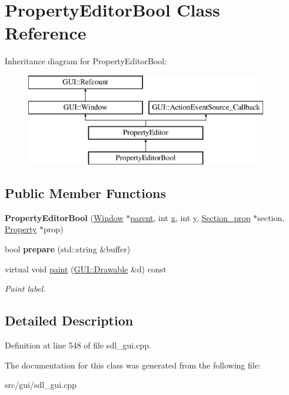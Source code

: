 \hypertarget{classPropertyEditorBool}{\section{Property\-Editor\-Bool Class Reference}
\label{classPropertyEditorBool}
}
Inheritance diagram for Property\-Editor\-Bool\-:\begin{figure}[H]
\begin{center}
\leavevmode
\includegraphics[height=4.000000cm]{classPropertyEditorBool}
\end{center}
\end{figure}
\subsection*{Public Member Functions}
\begin{DoxyCompactItemize}
\item 
\hypertarget{classPropertyEditorBool_a428b59bceb9e5d0c7fae949eb43511da}{{\bfseries Property\-Editor\-Bool} (\hyperlink{classGUI_1_1Window_ae828e9daa964dfc65a3550fb03117d30}{Window} $\ast$\hyperlink{classGUI_1_1Window_a2e593ff65e7702178d82fe9010a0b539}{parent}, int \hyperlink{classGUI_1_1Window_a6ca6a80ca00c9e1d8ceea8d3d99a657d}{x}, int \hyperlink{classGUI_1_1Window_a0ee8e923aff2c3661fc2e17656d37adf}{y}, \hyperlink{classSection__prop}{Section\-\_\-prop} $\ast$section, \hyperlink{classProperty}{Property} $\ast$prop)}\label{classPropertyEditorBool_a428b59bceb9e5d0c7fae949eb43511da}

\item 
\hypertarget{classPropertyEditorBool_a44c917ecde4468be2873d8580d5072ce}{bool {\bfseries prepare} (std\-::string \&buffer)}\label{classPropertyEditorBool_a44c917ecde4468be2873d8580d5072ce}

\item 
\hypertarget{classPropertyEditorBool_aca0f7eb8cc8a7213f6c2277d8b49251d}{virtual void \hyperlink{classPropertyEditorBool_aca0f7eb8cc8a7213f6c2277d8b49251d}{paint} (\hyperlink{classGUI_1_1Drawable}{G\-U\-I\-::\-Drawable} \&d) const }\label{classPropertyEditorBool_aca0f7eb8cc8a7213f6c2277d8b49251d}

\begin{DoxyCompactList}\small\item\em Paint label. \end{DoxyCompactList}\end{DoxyCompactItemize}


\subsection{Detailed Description}


Definition at line 548 of file sdl\-\_\-gui.\-cpp.



The documentation for this class was generated from the following file\-:\begin{DoxyCompactItemize}
\item 
src/gui/sdl\-\_\-gui.\-cpp\end{DoxyCompactItemize}
